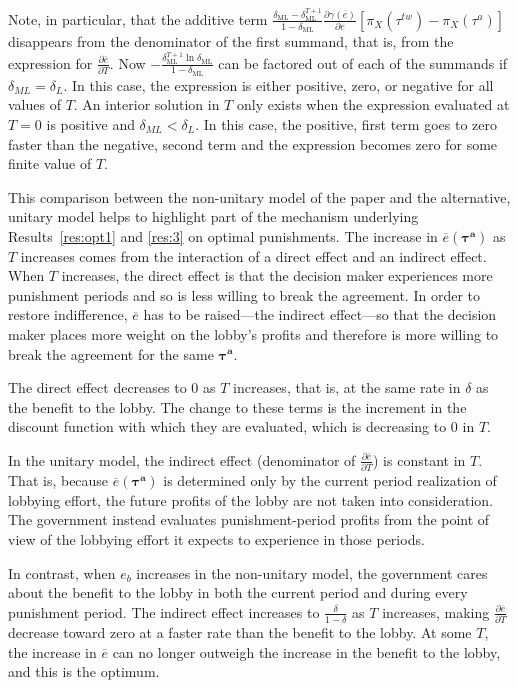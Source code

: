 \documentclass[authoryear, review]{elsarticle}
\newcommand{\ov}{\overline}
\newcommand{\bta}{\bm{\tau^a}}
\newcommand{\ga}{\gamma}
\newcommand{\de}{\delta}
\begin{document}
Note, in particular, that the additive term $\frac{\de_\text{ML} - \de_\text{ML}^{T+1}}{1-\de_\text{ML}}\frac{\partial \ga(\ov{e})}{\partial e} \left[ \pi_X(\tau^{tw}) - \pi_X(\tau^a) \right]$ disappears from the denominator of the first summand, that is, from the expression for $\frac{\partial \ov{e}}{\partial T}.$ Now $-\frac{\de_\text{ML}^{T+1}\ln\de_\text{ML}}{1-\de_\text{ML}}$ can be factored out of each of the summands if $\de_{ML} = \de_L$. In this case, the expression is either positive, zero, or negative for all values of $T$. An interior solution in $T$ only exists when the expression evaluated at $T=0$ is positive and $\de_{ML} < \de_L$. In this case, the positive, first term goes to zero faster than the negative, second term and the expression becomes zero for some finite value of $T$.

This comparison between the non-unitary model of the paper and the alternative, unitary model helps to highlight part of the mechanism underlying Results~\ref{res:opt1} and \ref{res:3} on optimal punishments. The increase in $\ov{e}(\bta)$ as $T$ increases comes from the interaction of a direct effect and an indirect effect. When $T$ increases, the direct effect is that the decision maker experiences more punishment periods and so is less willing to break the agreement. In order to restore indifference, $\ov{e}$ has to be raised---the indirect effect---so that the decision maker places more weight on the lobby's profits and therefore is more willing to break the agreement for the same $\bta$.

The direct effect decreases to $0$ as $T$ increases, that is, at the same rate in $\de$ as the benefit to the lobby. The change to these terms is the increment in the discount function with which they are evaluated, which is decreasing to 0 in $T$.

In the unitary model, the indirect effect (denominator of $\frac{\partial \ov{e}}{\partial T}$) is constant in $T$. That is, because $\ov{e}(\bta)$ is determined only by the current period realization of lobbying effort, the future profits of the lobby are not taken into consideration. The government instead evaluates punishment-period profits from the point of view of the lobbying effort it expects to experience in those periods. 

In contrast, when $e_b$ increases in the non-unitary model, the government cares about the benefit to the lobby in both the current period and during every punishment period. The indirect effect increases to $\frac{\de}{1-\de}$ as $T$ increases, making $\frac{\partial \ov{e}}{\partial T}$ decrease toward zero at a faster rate than the benefit to the lobby. At some $T$, the increase in $\ov{e}$ can no longer outweigh the increase in the benefit to the lobby, and this is the optimum.
\end{document}
